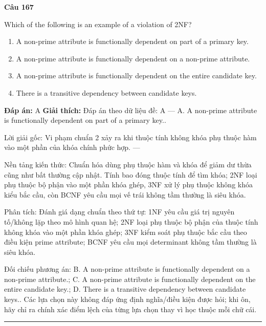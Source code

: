 \documentclass[11pt,a4paper]{article}
\newenvironment{question}[1]{%
  \par\vspace{1em}\noindent\textbf{\large Câu #1}\par\vspace{0.4em}
}{%
  \par\vspace{1em}\hrule\vspace{0.6em}
}
\newenvironment{choices}{%
  \begin{enumerate}[label=\textbf{\Alph*.},leftmargin=2.2em,itemsep=2pt,topsep=3pt]
}{%
  \end{enumerate}
}
\newcommand{\choice}{\item}
\begin{document}
\begin{question}{167}
Which of the following is an example of a violation of 2NF?
\begin{choices}
\choice A non-prime attribute is functionally dependent on part of a primary key.
\choice A non-prime attribute is functionally dependent on a non-prime attribute.
\choice A non-prime attribute is functionally dependent on the entire candidate key.
\choice There is a transitive dependency between candidate keys.
\end{choices}
\textbf{Đáp án:} A
\textbf{Giải thích:} Đáp án theo dữ liệu đề: A — A. A non-prime attribute is functionally dependent on part of a primary key..

Lời giải gốc: Vi phạm chuẩn 2 xảy ra khi thuộc tính không khóa phụ thuộc hàm vào một phần của khóa chính phức hợp. ---

Nền tảng kiến thức: Chuẩn hóa dùng phụ thuộc hàm và khóa để giảm dư thừa cũng như bất thường cập nhật. Tính bao đóng thuộc tính để tìm khóa; 2NF loại phụ thuộc bộ phận vào một phần khóa ghép, 3NF xử lý phụ thuộc không khóa kiểu bắc cầu, còn BCNF yêu cầu mọi vế trái không tầm thường là siêu khóa.

Phân tích: Đánh giá dạng chuẩn theo thứ tự: 1NF yêu cầu giá trị nguyên tố/không lặp theo mô hình quan hệ; 2NF loại phụ thuộc bộ phận của thuộc tính không khóa vào một phần khóa ghép; 3NF kiểm soát phụ thuộc bắc cầu theo điều kiện prime attribute; BCNF yêu cầu mọi determinant không tầm thường là siêu khóa.

Đối chiếu phương án: B. A non-prime attribute is functionally dependent on a non-prime attribute.; C. A non-prime attribute is functionally dependent on the entire candidate key.; D. There is a transitive dependency between candidate keys.. Các lựa chọn này không đáp ứng định nghĩa/điều kiện được hỏi; khi ôn, hãy chỉ ra chính xác điểm lệch của từng lựa chọn thay vì học thuộc mỗi chữ cái.
\end{question}
\end{document}
